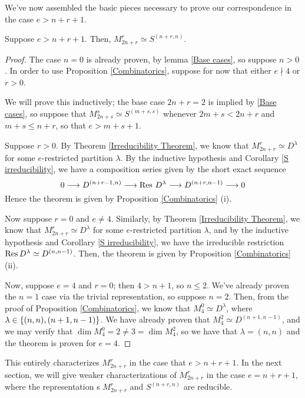 \documentclass{amsart}
\begin{document}
We've now assembled the basic pieces necessary to prove our correspondence in the case $e > n + r + 1$.

\begin{theorem}\label{Correspondence Theorem}
  Suppose $e > n + r + 1$.
  Then, $M_{2n + r}^r \simeq S^{(n+r,n)}$.
\end{theorem}
\begin{proof}
  The case $n = 0$ is already proven, by lemma \ref{Base cases}, so suppose $n > 0$.
  In order to use Proposition \ref{Combinatorics}, suppose for now that either $e \nmid 4$ or $r > 0$.

  We will prove this inductively; the base case $2n + r = 2$ is implied by \ref{Base cases}, so suppose that $M_{2n + s}^s \simeq S^{(m+s,s)}$ whenever $2m + s < 2n + r$ and $m + s \leq n + r$, so that $e > m + s + 1$.

  Suppose $r > 0$.
  By Theorem \ref{Irreducibility Theorem}, we know that $M_{2n + r}^r \simeq D^\lambda$ for some $e$-restricted partition $\lambda$.
  By the inductive hypothesis and Corollary \ref{S irreducibility}, we have a composition series given by the short exact sequence
  \begin{equation}
    \label{Composition Series} 0 \longrightarrow D^{(n + r - 1,n)} \longrightarrow \operatorname{Res} \, D^\lambda \longrightarrow D^{(n+r,n-1)} \longrightarrow 0
   \end{equation}
  Hence the theorem is given by Proposition \ref{Combinatorics} (i).

  Now suppose $r = 0$ and $e \neq 4$.
  Similarly, by Theorem \ref{Irreducibility Theorem}, we know that $M_{2n + r}^r \simeq D^\lambda$ for some $e$-restricted partition $\lambda$, and by the inductive hypothesis and Corollary \ref{S irreducibility}, we have the irreducible restriction $\operatorname{Res} D^\lambda \simeq D^{(n,n-1)}$.
  Then, the theorem is given by Proposition \ref{Combinatorics} (ii).

  Now, suppose $e = 4$ and $r = 0$;
  then $4 > n + 1$, so $n \leq 2$.
  We've already proven the $n = 1$ case via the trivial representation, so suppose $n = 2$.
  Then, from the proof of Proposition \ref{Combinatorics}, we know that $M_{4}^0 \simeq D^\lambda$, where $\lambda \in \left\{ (n,n), (n+1,n-1) \right\}$.
  We have already proven that $M_4^2 \simeq D^{(n+1,n-1)}$, and we may verify that $\dim M_4^0 = 2 \neq 3 = \dim M_4^2$, so we have that $\lambda = (n,n)$ and the theorem is proven for $e = 4$.
\end{proof}

  This entirely characterizes $M_{2n + r}^r$ in the case that $e > n + r + 1$.
  In the next section, we will give weaker characterizations of $M_{2n + r}^r$ in the case $e = n + r + 1$, where the representation s $M_{2n + r}^r$ and $S^{(n+r,n)}$ are reducible.
\end{document}
